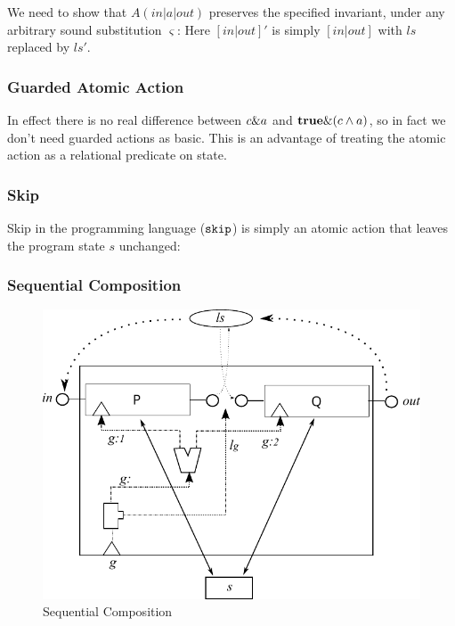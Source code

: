 We need to show that $A(in|a|out)$ preserves the specified
invariant, under any arbitrary sound substitution $\varsigma$:
Here $[in|out]'$ is simply $[in|out]$ with $ls$ replaced by $ls'$.

\subsubsection{Guarded Atomic Action}
In effect there is no real difference between $c \& a$
and $\mathbf{true} \& (c \land a)$,
so in fact we don't need guarded actions as basic.
This is an advantage of treating the atomic action as a relational predicate
on state.


\subsubsection{Skip}

Skip in the programming language ($\texttt{skip}$)
is simply an atomic action that leaves the program state $s$ unchanged:

\subsubsection{Sequential Composition}

\begin{figure}
  \centering
  \includegraphics[scale=0.85]{images/seq-comp-actual}
  \caption{Sequential Composition}
  \label{fig:seq-comp}
\end{figure}

